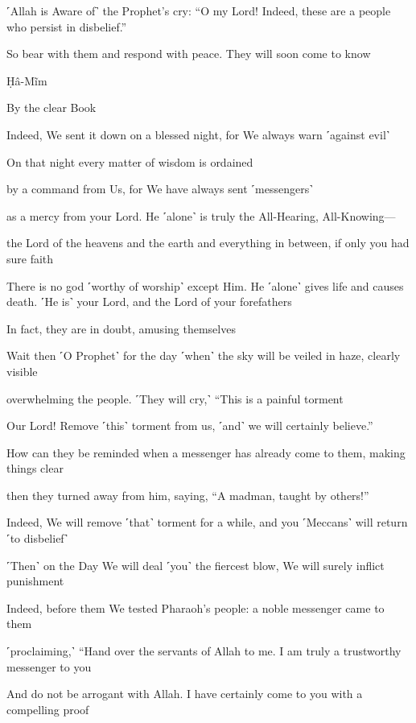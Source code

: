 ˹Allah is Aware of˺ the Prophet’s cry: “O my Lord! Indeed, these are a people who persist in disbelief.”

So bear with them and respond with peace. They will soon come to know

Ḥâ-Mĩm

By the clear Book

Indeed, We sent it down on a blessed night, for We always warn ˹against evil˺

On that night every matter of wisdom is ordained

by a command from Us, for We have always sent ˹messengers˺

as a mercy from your Lord. He ˹alone˺ is truly the All-Hearing, All-Knowing—

the Lord of the heavens and the earth and everything in between, if only you had sure faith

There is no god ˹worthy of worship˺ except Him. He ˹alone˺ gives life and causes death. ˹He is˺ your Lord, and the Lord of your forefathers

In fact, they are in doubt, amusing themselves

Wait then ˹O Prophet˺ for the day ˹when˺ the sky will be veiled in haze, clearly visible

overwhelming the people. ˹They will cry,˺ “This is a painful torment

Our Lord! Remove ˹this˺ torment from us, ˹and˺ we will certainly believe.”

How can they be reminded when a messenger has already come to them, making things clear

then they turned away from him, saying, “A madman, taught by others!”

Indeed, We will remove ˹that˺ torment for a while, and you ˹Meccans˺ will return ˹to disbelief˺

˹Then˺ on the Day We will deal ˹you˺ the fiercest blow, We will surely inflict punishment

Indeed, before them We tested Pharaoh’s people: a noble messenger came to them

˹proclaiming,˺ “Hand over the servants of Allah to me. I am truly a trustworthy messenger to you

And do not be arrogant with Allah. I have certainly come to you with a compelling proof

